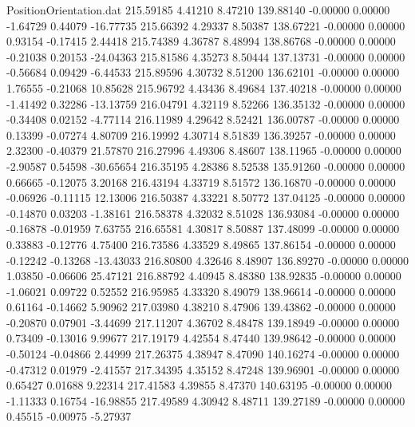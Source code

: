 \begin{filecontents}{PositionOrientation.dat}
 215.59185    4.41210    8.47210   139.88140   -0.00000    0.00000   -1.64729    0.44079  -16.77735
 215.66392    4.29337    8.50387   138.67221   -0.00000    0.00000    0.93154   -0.17415    2.44418
 215.74389    4.36787    8.48994   138.86768   -0.00000    0.00000   -0.21038    0.20153  -24.04363
 215.81586    4.35273    8.50444   137.13731   -0.00000    0.00000   -0.56684    0.09429   -6.44533
 215.89596    4.30732    8.51200   136.62101   -0.00000    0.00000    1.76555   -0.21068   10.85628
 215.96792    4.43436    8.49684   137.40218   -0.00000    0.00000   -1.41492    0.32286  -13.13759
 216.04791    4.32119    8.52266   136.35132   -0.00000    0.00000   -0.34408    0.02152   -4.77114
 216.11989    4.29642    8.52421   136.00787   -0.00000    0.00000    0.13399   -0.07274    4.80709
 216.19992    4.30714    8.51839   136.39257   -0.00000    0.00000    2.32300   -0.40379   21.57870
 216.27996    4.49306    8.48607   138.11965   -0.00000    0.00000   -2.90587    0.54598  -30.65654
 216.35195    4.28386    8.52538   135.91260   -0.00000    0.00000    0.66665   -0.12075    3.20168
 216.43194    4.33719    8.51572   136.16870   -0.00000    0.00000   -0.06926   -0.11115   12.13006
 216.50387    4.33221    8.50772   137.04125   -0.00000    0.00000   -0.14870    0.03203   -1.38161
 216.58378    4.32032    8.51028   136.93084   -0.00000    0.00000   -0.16878   -0.01959    7.63755
 216.65581    4.30817    8.50887   137.48099   -0.00000    0.00000    0.33883   -0.12776    4.75400
 216.73586    4.33529    8.49865   137.86154   -0.00000    0.00000   -0.12242   -0.13268  -13.43033
 216.80800    4.32646    8.48907   136.89270   -0.00000    0.00000    1.03850   -0.06606   25.47121
 216.88792    4.40945    8.48380   138.92835   -0.00000    0.00000   -1.06021    0.09722    0.52552
 216.95985    4.33320    8.49079   138.96614   -0.00000    0.00000    0.61164   -0.14662    5.90962
 217.03980    4.38210    8.47906   139.43862   -0.00000    0.00000   -0.20870    0.07901   -3.44699
 217.11207    4.36702    8.48478   139.18949   -0.00000    0.00000    0.73409   -0.13016    9.99677
 217.19179    4.42554    8.47440   139.98642   -0.00000    0.00000   -0.50124   -0.04866    2.44999
 217.26375    4.38947    8.47090   140.16274   -0.00000    0.00000   -0.47312    0.01979   -2.41557
 217.34395    4.35152    8.47248   139.96901   -0.00000    0.00000    0.65427    0.01688    9.22314
 217.41583    4.39855    8.47370   140.63195   -0.00000    0.00000   -1.11333    0.16754  -16.98855
 217.49589    4.30942    8.48711   139.27189   -0.00000    0.00000    0.45515   -0.00975   -5.27937

\end{filecontents}
